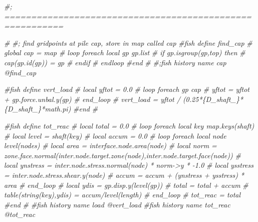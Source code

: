 \documentclass[a4paper, nobind]{templates/ociamthesis}
\newenvironment{Shaded}{\begin{snugshade}}{\end{snugshade}}
\newcommand{\CommentTok}[1]{\textcolor[rgb]{0.56,0.35,0.01}{\textit{#1}}}
\renewenvironment{Shaded}
{
  \vspace{10pt}%
  \begin{snugshade}%
}{%
  \end{snugshade}%
  \vspace{8pt}%
}
\begin{document}
\begin{Shaded}
\begin{Highlighting}[]
\CommentTok{\#; =========================================================}






\CommentTok{\#}
\CommentTok{\#; find gridpoints at pile cap, store in map called cap}
\CommentTok{\#fish define find\_cap}
\CommentTok{\#    global cap = map}
\CommentTok{\#    loop foreach local gp gp.list}
\CommentTok{\#        if gp.isgroup(gp,\textquotesingle{}top\textquotesingle{}) then}
\CommentTok{\#            cap(gp.id(gp)) = gp}
\CommentTok{\#        endif}
\CommentTok{\#    endloop}
\CommentTok{\#end}
\CommentTok{\#}
\CommentTok{\#;fish history name \textquotesingle{}cap\textquotesingle{} @find\_cap}


\CommentTok{\#fish define vert\_load}
\CommentTok{\#    local yftot = 0.0}
\CommentTok{\#    loop foreach gp cap}
\CommentTok{\#        yftot = yftot + gp.force.unbal.y(gp)}
\CommentTok{\#    end\_loop}
\CommentTok{\#    vert\_load = yftot / (0.25*\{D\_shaft\_\}*\{D\_shaft\_\}*math.pi)}
\CommentTok{\#end}
\CommentTok{\#}

\CommentTok{\#fish define tot\_reac}
\CommentTok{\#    local total = 0.0}
\CommentTok{\#    loop foreach local key map.keys(shaft)}
\CommentTok{\#        local level = shaft(key)}
\CommentTok{\#        local accum = 0.0}
\CommentTok{\#        loop foreach local node level(\textquotesingle{}nodes\textquotesingle{})}
\CommentTok{\#            local area = interface.node.area(node)}
\CommentTok{\#            local norm = zone.face.normal(inter.node.target.zone(node),inter.node.target.face(node))}
\CommentTok{\#            local ynstress = inter.node.stress.normal(node) * norm{-}\textgreater{}y * {-}1.0}
\CommentTok{\#            local ysstress = inter.node.stress.shear.y(node)}
\CommentTok{\#            accum = accum + (ynstress + ysstress) *  area}
\CommentTok{\#        end\_loop}
\CommentTok{\#        local ydis = gp.disp.y(level(\textquotesingle{}gp\textquotesingle{}))}
\CommentTok{\#        total = total + accum}
\CommentTok{\#        table(string(key),ydis) = accum/level(\textquotesingle{}length\textquotesingle{})}
\CommentTok{\#    end\_loop}
\CommentTok{\#    tot\_reac = total}
\CommentTok{\#end}
\CommentTok{\#}
\CommentTok{\#fish history name \textquotesingle{}load\textquotesingle{} @vert\_load}
\CommentTok{\#fish history name \textquotesingle{}tot\_reac\textquotesingle{} @tot\_reac}



















\end{Highlighting}
\end{Shaded}
\end{document}
